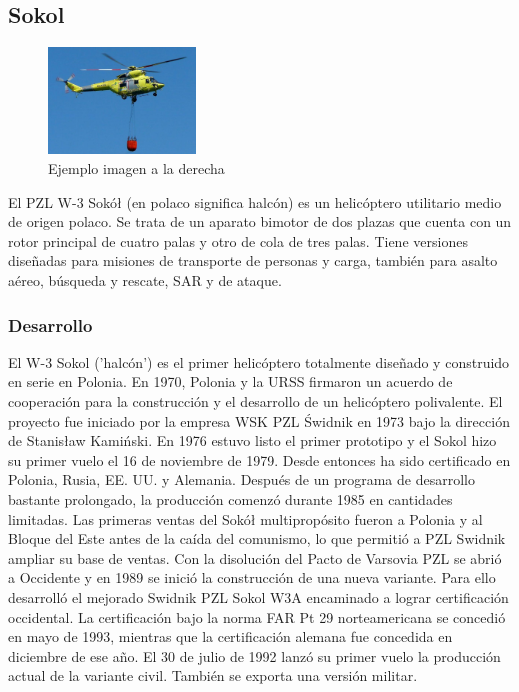 \subsection{Sokol}
\begin{figure}
  \begin{center}
    \includegraphics[width=0.35\textwidth]{images/sokol.jpg}
  \end{center}
  \caption{Ejemplo imagen a la derecha}
\end{figure}
El PZL W-3 Sokół (en polaco significa halcón) es un helicóptero utilitario medio de origen polaco. Se trata de un aparato bimotor de dos plazas que cuenta con un rotor principal de cuatro palas y otro de cola de tres palas. Tiene versiones diseñadas para misiones de transporte de personas y carga, también para asalto aéreo, búsqueda y rescate, SAR y de ataque. 
\subsubsection{Desarrollo}
El W-3 Sokol ('halcón') es el primer helicóptero totalmente diseñado y construido en serie en Polonia. En 1970, Polonia y la URSS firmaron un acuerdo de cooperación para la construcción y el desarrollo de un helicóptero polivalente. El proyecto fue iniciado por la empresa WSK PZL Świdnik en 1973 bajo la dirección de Stanisław Kamiński. En 1976 estuvo listo el primer prototipo y el Sokol hizo su primer vuelo el 16 de noviembre de 1979. Desde entonces ha sido certificado en Polonia, Rusia, EE. UU. y Alemania. Después de un programa de desarrollo bastante prolongado, la producción comenzó durante 1985 en cantidades limitadas. Las primeras ventas del Sokół multipropósito fueron a Polonia y al Bloque del Este antes de la caída del comunismo, lo que permitió a PZL Swidnik ampliar su base de ventas. Con la disolución del Pacto de Varsovia PZL se abrió a Occidente y en 1989 se inició la construcción de una nueva variante. Para ello desarrolló el mejorado Swidnik PZL Sokol W3A encaminado a lograr certificación occidental. La certificación bajo la norma FAR Pt 29 norteamericana se concedió en mayo de 1993, mientras que la certificación alemana fue concedida en diciembre de ese año. El 30 de julio de 1992 lanzó su primer vuelo la producción actual de la variante civil. También se exporta una versión militar.


